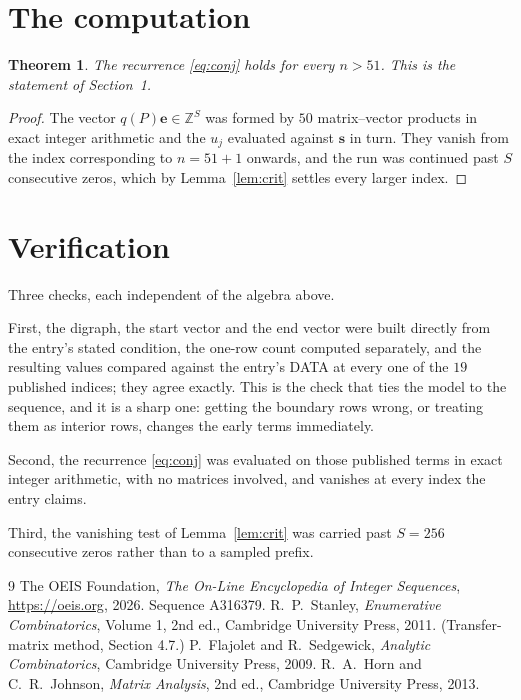 \documentclass[11pt,a4paper]{article}
\theoremstyle{plain}
\newtheorem{theorem}{Theorem}
\theoremstyle{definition}
\begin{document}
\section{The computation}

\begin{theorem}
The recurrence \eqref{eq:conj} holds for every $n>51$. This is the statement of
Section~1.
\end{theorem}

\begin{proof}
The vector $q(P)\mathbf{e}\in\mathbb{Z}^{S}$ was formed by $50$ matrix--vector
products in exact integer arithmetic and the $u_j$ evaluated against $\mathbf{s}$ in turn.
They vanish from the index corresponding to $n=51+1$ onwards, and the run was continued
past $S$ consecutive zeros, which by Lemma~\ref{lem:crit} settles every larger index.
\end{proof}

\section{Verification}

Three checks, each independent of the algebra above.

First, the digraph, the start vector and the end vector were built directly from the
entry's stated condition, the one-row count computed separately, and the resulting values
compared against the entry's DATA at every one of the $19$ published indices; they
agree exactly. This is the check that ties the model to the sequence, and it is a sharp one:
getting the boundary rows wrong, or treating them as interior rows, changes the early terms
immediately.

Second, the recurrence \eqref{eq:conj} was evaluated on those published terms in exact
integer arithmetic, with no matrices involved, and vanishes at every index the entry claims.

Third, the vanishing test of Lemma~\ref{lem:crit} was carried past $S=256$ consecutive
zeros rather than to a sampled prefix.

\begin{thebibliography}{9}
 The OEIS Foundation, \emph{The On-Line Encyclopedia of Integer
Sequences}, \url{https://oeis.org}, 2026. Sequence A316379.
 R.~P.~Stanley, \emph{Enumerative Combinatorics}, Volume 1, 2nd ed.,
Cambridge University Press, 2011. (Transfer-matrix method, Section 4.7.)
 P.~Flajolet and R.~Sedgewick, \emph{Analytic Combinatorics}, Cambridge
University Press, 2009.
 R.~A.~Horn and C.~R.~Johnson, \emph{Matrix Analysis}, 2nd ed., Cambridge
University Press, 2013.
\end{thebibliography}
\end{document}
